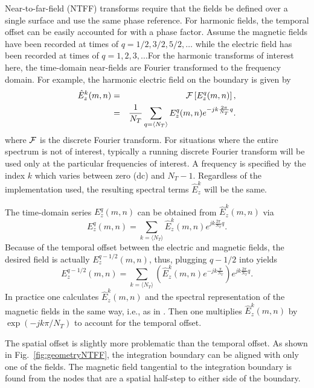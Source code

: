 Near-to-far-field (NTFF) transforms require that the fields be defined
over a single surface and use the same phase reference.  For harmonic
fields, the temporal offset can be easily accounted for with a phase
factor.  Assume the magnetic fields have been recorded at times of
$q=1/2, 3/2, 5/2,\ldots$ while the electric field has been recorded at
times of $q=1, 2, 3,\ldots$\@ For the harmonic transforms of interest
here, the time-domain near-fields are Fourier transformed to the
frequency domain.  For example, the harmonic electric field on the
boundary is given by
\begin{eqnarray}
  \hat{E}^k_z(m,n)
    &=& {\cal F}\left[E_z^q(m,n)\right], \\
    &=& \frac{1}{N_T}
        \sum_{q=\langle N_T\rangle} E_z^q(m,n) e^{-jk\frac{2\pi}{N_T}q}.
        \label{eq:dft}
\end{eqnarray}
where $\cal F$ is the discrete Fourier transform.  For situations
where the entire spectrum is not of interest, typically a running
discrete Fourier transform will be used only at the particular
frequencies of interest.  A frequency is specified by the index $k$
which varies between zero (dc) and $N_T-1$.  Regardless of the
implementation used, the resulting spectral terms $\hat{E}^k_z$ will be
the same.

The time-domain series $E_z^q(m,n)$ can be obtained from
$\hat{E}^k_z(m,n)$ via
\begin{equation}
  E_z^q(m,n) = \sum_{k=\langle N_T\rangle} 
               \hat{E}^k_z(m,n) e^{jk\frac{2\pi}{N_T}q}.
  \label{eq:ezq}
\end{equation}
Because of the temporal offset between the electric and magnetic
fields, the desired field is actually $E_z^{q-1/2}(m,n)$, thus,
plugging $q-1/2$ into  yields
\begin{equation}
  E_z^{q-1/2}(m,n) =
  \sum_{k=\langle N_T\rangle}
  \left(\hat{E}^k_z(m,n)e^{-jk\frac{\pi}{N_T}}\right) 
                        e^{jk\frac{2\pi}{N_T}q}.
\end{equation}
In practice one calculates $\hat{E}^k_z(m,n)$ and the spectral
representation of the magnetic fields in the same way, i.e., as in
.  Then one multiplies $\hat{E}^k_z(m,n)$ by
$\exp(-jk\pi/N_T)$ to account for the temporal offset.

The spatial offset is slightly more problematic than the temporal
offset.  As shown in Fig.\ \ref{fig:geometryNTFF}, the integration
boundary can be aligned with only one of the fields.  The magnetic
field tangential to the integration boundary is found from the nodes
that are a spatial half-step to either side of the boundary.

